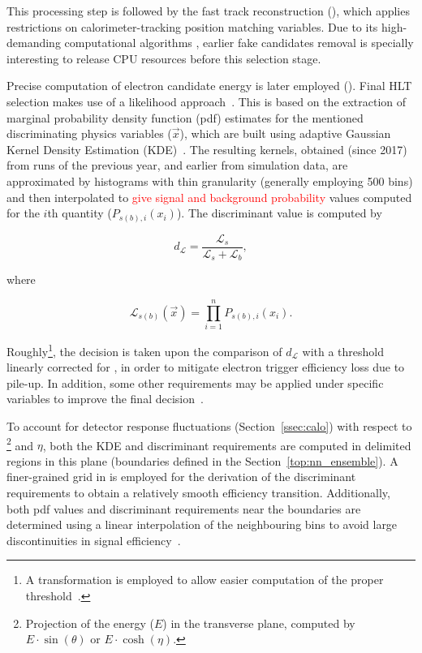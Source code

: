   
  
This processing step is followed by the fast track reconstruction
(\fastelectron), which applies restrictions on calorimeter-tracking position
matching variables. Due to its high-demanding computational algorithms %
, earlier fake candidates removal is specially
interesting to release CPU resources before this selection stage.


Precise computation of electron candidate energy is later employed
(\hltcalo). Final HLT selection makes use of a likelihood
approach~\cite{ATL-COM-PHYS-2017-1012,ATLAS-PERF-2017-01-002}. This is based on the extraction of marginal probability density
function (pdf) estimates for the mentioned discriminating physics
variables ($\vec{x}$), which are built using adaptive Gaussian Kernel Density Estimation (KDE)~\cite{Silverman2018,TMVA}. The
resulting kernels, obtained (since 2017) from runs of the previous year, and
earlier from simulation data, are approximated by histograms with thin
granularity (generally employing 500 bins) and then interpolated to \textcolor{red}{give signal
and background probability} values computed for the $i$th quantity
($P_{s(b),i}(x_i)$). The discriminant value is computed by


\begin{equation}
  d_{\mathcal{L}} = \frac{\mathcal{L}_{s}}{\mathcal{L}_{s} + \mathcal{L}_{b}},
\end{equation}
  
\noindent where
  
\begin{equation}
\mathcal{L}_{s(b)}(\vec{x}) = \prod_{i=1}^{n} P_{s(b),i}(x_i).
\label{eq:likelihoods}
\end{equation}

\noindent Roughly\footnote{A transformation is employed to allow
easier computation of the proper threshold~\cite{aaboud2019electron}.},
the decision is taken upon the comparison of $d_{\mathcal{L}}$ with a
threshold linearly corrected for \avgmu{}, in order to mitigate electron trigger
efficiency loss due to pile-up. In addition, some other requirements may be
applied under specific variables to improve the final
decision~\cite{aaboud2019electron}.

To account for detector response fluctuations (Section~\ref{ssec:calo}) with
respect to \Et\footnote{Projection of the energy ($E$) in the transverse plane,
computed by $E\cdot\sin(\theta)$ or $E\cdot\cosh(\eta)$.} and
$\eta$, both the KDE and discriminant requirements are computed in delimited
regions in this plane (boundaries defined in the Section~\ref{top:nn_ensemble}).
A finer-grained grid in \Et is employed for the derivation of the discriminant
requirements to obtain a relatively smooth efficiency transition. Additionally,
both pdf values and discriminant requirements near the boundaries are determined
using a linear interpolation of the neighbouring bins to avoid large
discontinuities in signal efficiency~\cite{aaboud2019electron}.

